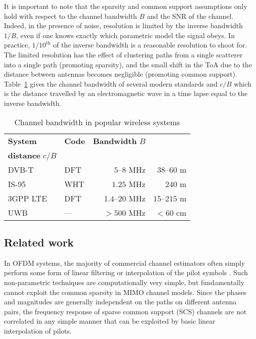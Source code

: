 \documentclass[journal,10pt]{IEEEtran}
\renewcommand{\arraystretch}{1.2}
\newcommand{\ra}[1]{\renewcommand{\arraystretch}{#1}}
\begin{document}
It is important to note that the sparsity and common support assumptions only hold with respect to the channel bandwidth $B$ and the SNR of the channel. Indeed, in the presence of noise, resolution is limited by the inverse bandwidth $1/B$, even if one knows exactly which parametric model the signal obeys. In practice, $1/10^{\text{th}}$ of the inverse bandwidth is a reasonable resolution to shoot for. The limited resolution has the effect of clustering paths from a single scatterer into a single path (promoting sparsity), and the small shift in the ToA due to the distance between antennas becomes negligible (promoting common support). Table~\ref{tabl:invB} gives the channel bandwidth of several modern standards and $c/B$ which is the distance travelled by an electromagnetic wave in a time lapse equal to the inverse bandwidth.

\begin{table}[t]\centering  \ra{1.3}\caption{Channel bandwidth in popular wireless systems}
\begin{tabular}{@{}llrr@{}}\toprule
\textbf{System} & \textbf{Code}& \textbf{Bandwidth} $B$ & \begin{array}{r}\textbf{Resolvable}\vspace{-8pt}\\ \textbf{distance } $c/B$\end{array} \\\midrule
DVB-T \cite{ETSI2001}& DFT & $5$--$8$ MHz & $38$--$60$ m\\
IS-95  \cite{Garg2000}& WHT& $1.25$ MHz & $240$ m\\3GPP LTE \cite{Dahlman2008}& DFT & $1.4$--$20$ MHz & $15$--$215$ m\\   UWB & --- &  $>500$ MHz & $<60$ cm\\
\bottomrule
\end{tabular} \label{tabl:invB}\vspace{-4mm}
\end{table}


\subsection{Related work}
In OFDM systems, the majority of commercial channel estimators often simply perform 
some form of linear filtering or interpolation of the pilot symbols \cite{RanaKC:10,KarakayaAC:08}.
Such non-parametric techniques are computationally very simple, but fundamentally 
cannot exploit the common sparsity in MIMO channel models. Since the phases and magnitudes are generally independent on the paths on different antenna pairs, the frequency response of sparse common support (SCS) channels are not correlated in any simple manner that can be exploited by basic linear interpolation of pilots.
\end{document}
